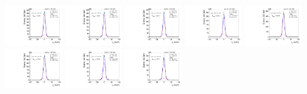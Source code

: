 \begin{figure}[htb]
\includegraphics[width=0.19\textwidth]{plots/Appendix_Recoil_Fits/WmpMC_PF_5TeV_2G/pfu2fit_24.pdf}
\includegraphics[width=0.19\textwidth]{plots/Appendix_Recoil_Fits/WmpMC_PF_5TeV_2G/pfu2fit_25.pdf}
\includegraphics[width=0.19\textwidth]{plots/Appendix_Recoil_Fits/WmpMC_PF_5TeV_2G/pfu2fit_26.pdf}
\includegraphics[width=0.19\textwidth]{plots/Appendix_Recoil_Fits/WmpMC_PF_5TeV_2G/pfu2fit_27.pdf}
\includegraphics[width=0.19\textwidth]{plots/Appendix_Recoil_Fits/WmpMC_PF_5TeV_2G/pfu2fit_28.pdf}
\includegraphics[width=0.19\textwidth]{plots/Appendix_Recoil_Fits/WmpMC_PF_5TeV_2G/pfu2fit_29.pdf}
\includegraphics[width=0.19\textwidth]{plots/Appendix_Recoil_Fits/WmpMC_PF_5TeV_2G/pfu2fit_30.pdf}
\includegraphics[width=0.19\textwidth]{plots/Appendix_Recoil_Fits/WmpMC_PF_5TeV_2G/pfu2fit_31.pdf}

\end{figure}
